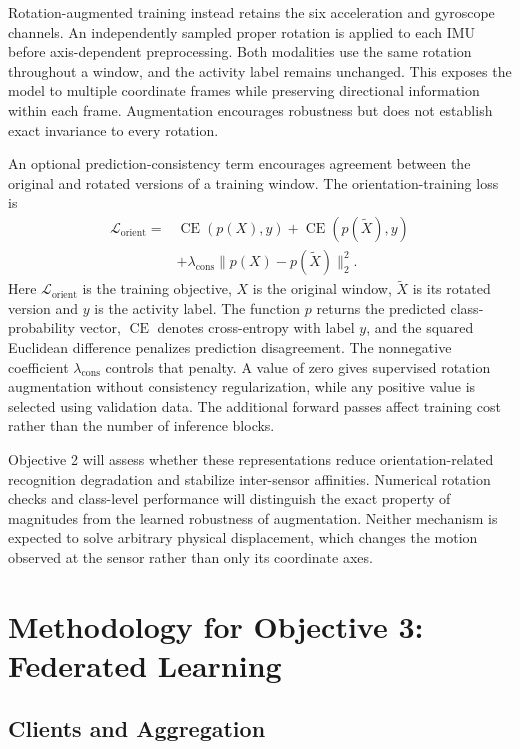 \documentclass[10pt,a4paper,oneside,openany]{report}
\begin{document}
Rotation-augmented training instead retains the six acceleration and gyroscope channels. An independently sampled proper rotation is applied to each IMU before axis-dependent preprocessing. Both modalities use the same rotation throughout a window, and the activity label remains unchanged. This exposes the model to multiple coordinate frames while preserving directional information within each frame. Augmentation encourages robustness but does not establish exact invariance to every rotation.

An optional prediction-consistency term encourages agreement between the original and rotated versions of a training window. The orientation-training loss is
\[
\begin{aligned}
\mathcal L_{\mathrm{orient}}={}&\operatorname{CE}(p(X),y)
+\operatorname{CE}(p(\widetilde X),y)\\
&+\lambda_{\mathrm{cons}}\|p(X)-p(\widetilde X)\|_2^2.
\end{aligned}
\]
Here $\mathcal L_{\mathrm{orient}}$ is the training objective, $X$ is the original window, $\widetilde X$ is its rotated version and $y$ is the activity label. The function $p$ returns the predicted class-probability vector, $\operatorname{CE}$ denotes cross-entropy with label $y$, and the squared Euclidean difference penalizes prediction disagreement. The nonnegative coefficient $\lambda_{\mathrm{cons}}$ controls that penalty. A value of zero gives supervised rotation augmentation without consistency regularization, while any positive value is selected using validation data. The additional forward passes affect training cost rather than the number of inference blocks.

Objective 2 will assess whether these representations reduce orientation-related recognition degradation and stabilize inter-sensor affinities. Numerical rotation checks and class-level performance will distinguish the exact property of magnitudes from the learned robustness of augmentation. Neither mechanism is expected to solve arbitrary physical displacement, which changes the motion observed at the sensor rather than only its coordinate axes.

\section{Methodology for Objective 3: Federated Learning}

\subsection{Clients and Aggregation}
\end{document}
